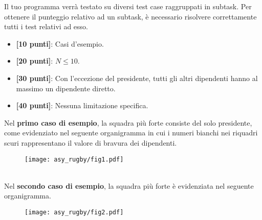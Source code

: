 \Scoring
Il tuo programma verrà testato su diversi test case raggruppati in subtask.
Per ottenere il punteggio relativo ad un subtask, è necessario risolvere
correttamente tutti i test relativi ad esso.

\begin{itemize}[nolistsep,itemsep=2mm]
  \item \textbf{ [10 punti]}: Casi d'esempio.
  \item \textbf{ [20 punti]}: $N \leq 10$.
  \item \textbf{ [30 punti]}: Con l'eccezione del presidente, tutti gli altri dipendenti hanno al massimo un dipendente diretto.
  \item \textbf{ [40 punti]}: Nessuna limitazione specifica.
\end{itemize}

\Examples
\begin{example}
%
\end{example}
\begin{example}
%
\end{example} 


\Explanation
Nel \textbf{primo caso di esempio}, la squadra più forte consiste del solo presidente, come evidenziato nel seguente organigramma in cui i numeri bianchi nei riquadri scuri rappresentano il valore di bravura dei dipendenti.
\begin{figure}[H]%
\centering\texttt{[image: asy\_rugby/fig1.pdf]}%
\end{figure}\\[2mm]
Nel \textbf{secondo caso di esempio}, la squadra più forte è evidenziata nel seguente organigramma.
\begin{figure}[H]%
\centering\texttt{[image: asy\_rugby/fig2.pdf]}%
\end{figure}
